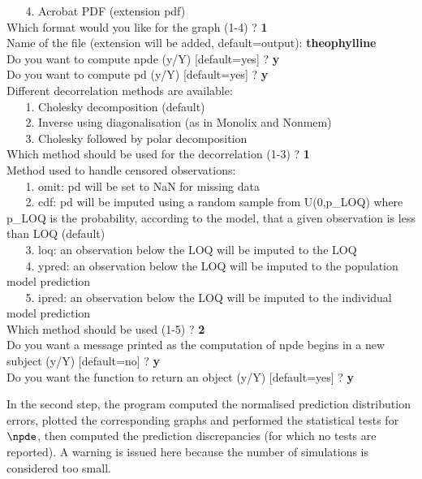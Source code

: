 {$\phantom{me}$\hskip 0.5cm         4. Acrobat PDF (extension pdf)\\
Which format would you like for the graph (1-4) ? \textcolor{mycol}{\bf 1}\\
Name of the file (extension will be added, default=output): 
\textcolor{mycol}{\bf theophylline}\\
Do you want to compute npde (y/Y) [default=yes] ? \textcolor{mycol}{\bf y}\\
Do you want to compute pd (y/Y) [default=yes] ? \textcolor{mycol}{\bf y}\\
Different decorrelation methods are available:\\
$\phantom{me}$\hskip 0.5cm         1. Cholesky decomposition (default)\\
$\phantom{me}$\hskip 0.5cm         2. Inverse using diagonalisation (as in Monolix and Nonmem)\\
$\phantom{me}$\hskip 0.5cm         3. Cholesky followed by polar decomposition\\
Which method should be used for the decorrelation (1-3) ? \textcolor{mycol}{\bf 1}\\
Method used to handle censored observations:\\
$\phantom{me}$\hskip 0.5cm         1. omit: pd will be set to NaN for missing data\\
$\phantom{me}$\hskip 0.5cm         2. cdf: pd will be imputed using a random sample from U(0,p\_LOQ) where p\_LOQ is the probability, according to the model, that a given observation is less than LOQ (default)\\
$\phantom{me}$\hskip 0.5cm         3. loq: an observation below the LOQ will be imputed to the LOQ\\
$\phantom{me}$\hskip 0.5cm         4. ypred: an observation below the LOQ will be imputed to the population model prediction\\
$\phantom{me}$\hskip 0.5cm         5. ipred: an observation below the LOQ will be imputed to the individual model prediction\\
Which method should be used (1-5) ? \textcolor{mycol}{\bf 2}\\
Do you want a message printed as the computation of npde begins in a new
subject (y/Y) [default=no] ? \textcolor{mycol}{\bf y}\\
Do you want the function to return an object (y/Y) [default=yes] ? \textcolor{mycol}{\bf y}\\
}

In the second step, the program computed the normalised prediction distribution errors, plotted the corresponding graphs and performed the statistical tests for $\npde$, then computed the prediction discrepancies (for which no tests are reported). A warning is issued here because the number of simulations is considered too small. 


